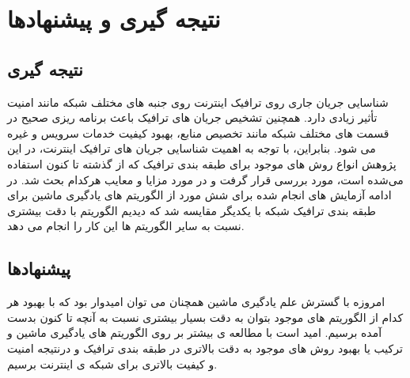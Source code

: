 \chapter{ نتیجه گیری و پیشنهادها}
\section{نتیجه گیری}

شناسایی جریان جاری روی ترافیک اینترنت روی جنبه های مختلف شبکه مانند امنیت تأثیر زیادی دارد. همچنین تشخیص جریان های ترافیک باعث برنامه ریزی صحیح در قسمت های مختلف شبکه مانند تخصیص منابع، بهبود کیفیت خدمات سرویس و غیره می شود. بنابراین، با توجه به اهمیت شناسایی جریان های ترافیک اینترنت، در این پژوهش انواع روش های موجود برای طبقه بندی ترافیک که از گذشته تا کنون استفاده می‌شده است، مورد بررسی قرار گرفت و در مورد مزایا و معایب هرکدام بحث شد. در ادامه آزمایش های انجام شده برای شش مورد از الگوریتم های یادگیری ماشین برای طبقه بندی ترافیک شبکه با یکدیگر مقایسه شد که دیدیم الگوریتم  با دقت بیشتری نسبت به سایر الگوریتم ها این کار را انجام می دهد.

\section{پیشنهادها}
امروزه با گسترش علم یادگیری ماشین همچنان می توان امیدوار بود که با بهبود هر کدام از الگوریتم های موجود بتوان به دقت بسیار بیشتری نسبت به آنچه تا کنون بدست آمده برسیم. امید است با مطالعه ی بیشتر بر روی الگوریتم های یادگیری ماشین و ترکیب یا بهبود روش های موجود به دقت بالاتری در طبقه بندی ترافیک و درنتیجه امنیت و کیفیت بالاتری برای شبکه ی اینترنت برسیم.